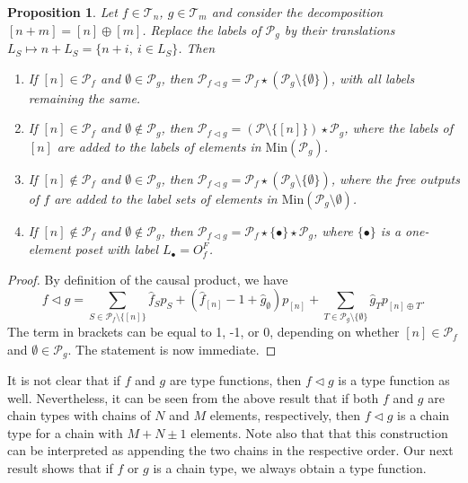 \documentclass[12pt]{article}
\newtheorem{prop}{Proposition}
\theoremstyle{definition}
\theoremstyle{remark}
\def\Te{\mathcal T}
\def\Pe{\mathcal P}
\def\vtl{\vartriangleleft}
\begin{document}
\begin{prop}\label{prop:vtl_ordinal} Let $f\in \Te_{n}$, $g\in \Te_{m}$
and
consider the decomposition $[n+m]=[n]\oplus[m]$. Replace the labels of $\Pe_g$ by their
translations $L_S\mapsto n+L_S=\{n+i,\ i\in L_S\}$.
Then  
\begin{enumerate}
\item[(a)] If $[n]\in \Pe_f$ and $\emptyset \in \Pe_g$, then $\Pe_{f\vtl g}=\Pe_f\star
(\Pe_g\setminus\{\emptyset\})$, with all labels remaining the same.
\item[(b)] If $[n]\in \Pe_f$ and $\emptyset \notin \Pe_g$, then $\Pe_{f\vtl
g}=(\Pe\setminus \{[n]\})\star \Pe_g$, where the labels of $[n]$ are added to the
labels of elements in $\mathrm{Min}(\Pe_g)$.
\item[(c)] If $[n]\notin \Pe_f$ and $\emptyset \in \Pe_g$, then $\Pe_{f\vtl g}=\Pe_f\star
(\Pe_g\setminus\{\emptyset\})$, where the free outputs  of $f$ are added to the label sets
of elements in $\mathrm{Min}(\Pe_g\setminus \emptyset)$.
\item[(d)] If $[n]\notin \Pe_f$ and $\emptyset \notin \Pe_g$, then $\Pe_{f\vtl
g}=\Pe_f\star \{\bullet\}\star \Pe_g$, where $\{\bullet\}$ is a one-element poset with
label $L_\bullet=O_f^F$.

\end{enumerate}

\end{prop}



\begin{proof} By definition of the causal product, we have  
\[
f\vtl g=\sum_{S\in \Pe_f\setminus\{[n]\}} \hat f_Sp_S+ (\hat f_{[n]}-1 + \hat
g_\emptyset)p_{[n]}+\sum_{T\in \Pe_g\setminus \{\emptyset\}} \hat g_T p_{[n]\oplus T}.
\]
The term in brackets can be equal to 1, -1, or 0, depending on whether $[n]\in \Pe_f$ and
$\emptyset\in \Pe_g$. The statement is now immediate.


\end{proof}



It is not clear that if $f$ and $g$ are type functions, then $f\vtl g$ is a type function as well. 
Nevertheless, it can be seen from the above result
that if both $f$ and $g$ are chain types with chains of $N$ and $M$ elements,
respectively, then $f\vtl g$ is a chain type for a chain with $M+N\pm 1$
elements. Note also that that this construction can be
interpreted as appending the two chains in the respective order. 
Our next result shows that if $f$ or $g$ is a chain type, we always obtain a type
function.
\end{document}
